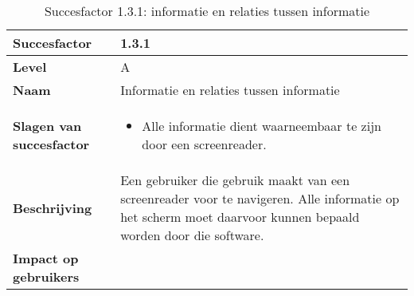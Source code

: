 \newpage
\begin{table}[H]
    \centering
    \caption{Succesfactor 1.3.1: informatie en relaties tussen informatie}
    \hspace*{-1cm}\begin{tabular}{|l|p{12cm}|} 
        \hline
        \textbf{Succesfactor}                & 1.3.1                                                                                                                                                                                                                                                                                                             \\ 
        \hline
        \textbf{Level}                       & A                                                                                                                                                                                                                                                                                                                                                                             \\ 
        \hline
        \textbf{Naam}                        & Informatie en relaties tussen informatie~                                                                                                                                                                                                                                                                                                                                                            \\ 
        \hline
        \textbf{Slagen van succesfactor}     & \begin{itemize}
            \item Alle informatie dient waarneembaar te zijn door een screenreader.
        \end{itemize}                                                                                                                                                                                                                       
        \\ 
        \hline
        \textbf{Beschrijving}                & Een gebruiker die gebruik maakt van een screenreader voor te navigeren. Alle informatie op het scherm moet daarvoor kunnen bepaald worden door die software. \\ 
        \hline
        \textbf{Impact op gebruikers}        & 
        \begin{itemize}

\end{itemize}
\end{tabular}
\end{table}
